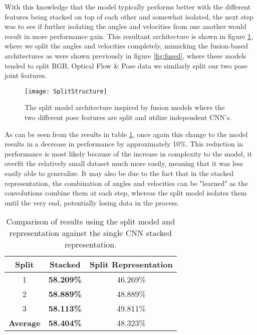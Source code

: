 With this knowledge that the model typically performs better with the different features being stacked on top of each other and somewhat isolated, the next step was to see if further isolating the angles and velocities from one another would result in more performance gain. This resultant architecture is shown in figure \ref{fig:split-architecture}, where we split the angles and velocities completely, mimicking the fusion-based architectures as were shown previously in figure \ref{fig:fused}, where these models tended to split RGB, Optical Flow \& Pose data we similarly split our two pose joint features.

\begin{figure}[ht]
	\texttt{[image: SplitStructure]}
	\centering
	\caption{The split model architecture inspired by fusion models where the two different pose features are split and utilize independent CNN's.}
	\label{fig:split-architecture}
\end{figure}

As can be seen from the results in table \ref{tab:acc-results-v-split}, once again this change to the model results in a decrease in performance by approximately 10\%. This reduction in performance is most likely because of the increase in complexity to the model, it overfit the relatively small dataset much more easily, meaning that it was less easily able to generalize. It may also be due to the fact that in the stacked representation, the combination of angles and velocities can be "learned" as the convolutions combine them at each step, whereas the split model isolates them until the very end, potentially losing data in the process.

\begin{table}[ht]
	\centering
	\begin{tabular}{||c c c||} 
		\hline
		\textbf{Split} & \textbf{Stacked} & \textbf{Split Representation} \\ [0.5ex] 
		\hline\hline
		1 & \textbf{58.209\%} & 46.269\% \\ 
		\hline
		2 & \textbf{58.889\%} & 48.889\% \\
		\hline
		3 & \textbf{58.113\%} & 49.811\% \\
		\hline
		\hline
		\textbf{Average} & \textbf{58.404\%} & 48.323\% \\
		\hline
	\end{tabular}
	\caption{Comparison of results using the split model and representation against the single CNN stacked representation.}
	\label{tab:acc-results-v-split}
\end{table}

